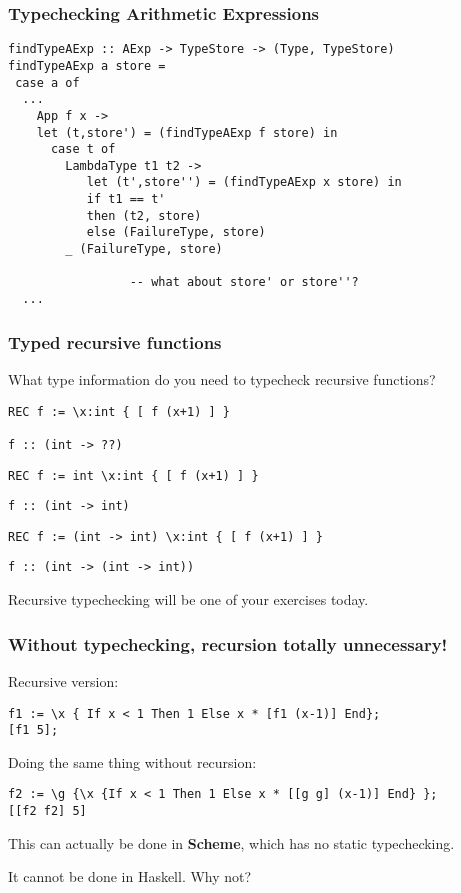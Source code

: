 \documentclass{beamer}
\begin{document}
\begin{frame}[fragile]
\frametitle{Typechecking Arithmetic Expressions}
\begin{verbatim}
findTypeAExp :: AExp -> TypeStore -> (Type, TypeStore)
findTypeAExp a store =
 case a of
  ...
    App f x -> 
    let (t,store') = (findTypeAExp f store) in
      case t of
        LambdaType t1 t2 -> 
           let (t',store'') = (findTypeAExp x store) in
           if t1 == t'
           then (t2, store)
           else (FailureType, store)
        _ (FailureType, store)
                 
                 -- what about store' or store''?
  ...
\end{verbatim}


\end{frame}
\begin{frame}[fragile]
\frametitle{Typed recursive functions}
What type information do you need to typecheck recursive functions?
\begin{verbatim}
REC f := \x:int { [ f (x+1) ] }

f :: (int -> ??)
\end{verbatim}

\pause
\begin{verbatim}
REC f := int \x:int { [ f (x+1) ] }
\end{verbatim}

\begin{verbatim}
f :: (int -> int)
\end{verbatim}

\begin{verbatim}
REC f := (int -> int) \x:int { [ f (x+1) ] }
\end{verbatim}
\pause
\begin{verbatim}
f :: (int -> (int -> int))
\end{verbatim}
\pause
Recursive typechecking will be one of your exercises today.
\end{frame}


\begin{frame}[fragile]
\frametitle{Without typechecking, recursion totally unnecessary!}

Recursive version:
\begin{verbatim}
f1 := \x { If x < 1 Then 1 Else x * [f1 (x-1)] End};
[f1 5];
\end{verbatim}

\bigskip

Doing the same thing without recursion:
\begin{verbatim}
f2 := \g {\x {If x < 1 Then 1 Else x * [[g g] (x-1)] End} };
[[f2 f2] 5]
\end{verbatim}

\pause

This can actually be done in {\bf Scheme}, which has no static typechecking.

It cannot be done in Haskell.  Why not?
\end{frame}
\end{document}
